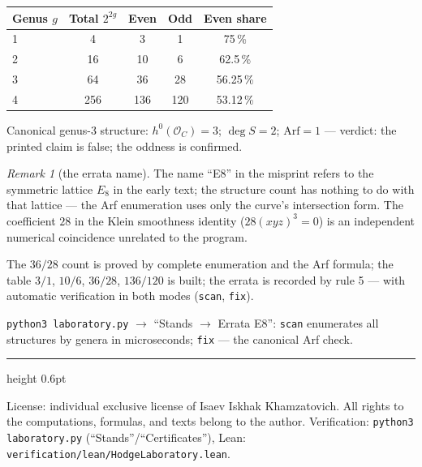 \documentclass[11pt,a4paper]{article}
\theoremstyle{plain}
\theoremstyle{definition}
\theoremstyle{remark}
\newtheorem{remark}[theorem]{Remark}
\begin{document}
\begin{databox}
\begin{center}
\begin{tabular}{@{}l c c c c@{}}
\toprule
Genus $g$ & Total $2^{2g}$ & Even & Odd & Even share \\
\midrule
1 & 4   & 3   & 1   & 75\,\% \\
2 & 16  & 10  & 6   & 62.5\,\% \\
3 & 64  & 36  & 28  & 56.25\,\% \\
4 & 256 & 136 & 120 & 53.12\,\% \\
\bottomrule
\end{tabular}
\end{center}
Canonical genus-3 structure: $h^0(\mathcal O_C)=3$; $\deg S=2$;
$\mathrm{Arf}=1$ --- verdict: the printed claim is false; the
oddness is confirmed.
\end{databox}

\begin{remark}[the errata name]
The name ``E8'' in the misprint refers to the symmetric lattice
$E_8$ in the early text; the structure count has nothing to do with
that lattice --- the Arf enumeration uses only the curve's
intersection form. The coefficient $28$ in the Klein smoothness
identity ($28(xyz)^3=0$) is an independent numerical coincidence
unrelated to the program.
\end{remark}

\begin{statusbox}[summary]
The $36/28$ count is proved by complete enumeration and the Arf formula; the table $3/1$, $10/6$, $36/28$, $136/120$ is built; the errata is recorded
by rule 5 --- with automatic verification in both modes
(\texttt{scan}, \texttt{fix}).
\end{statusbox}

\begin{verifybox}[reproduction]
\texttt{python3 laboratory.py} $\to$ ``Stands $\to$ Errata E8'':
\texttt{scan} enumerates all structures by genera in microseconds;
\texttt{fix} --- the canonical Arf check.
\end{verifybox}

\vfill
{\color{linkblue}\hrule height 0.6pt}
\vspace{0.5em}
{\small\color{gray}
License: individual exclusive license of Isaev Iskhak Khamzatovich.
All rights to the computations, formulas, and texts belong to the author.
Verification: \texttt{python3 laboratory.py} (``Stands''/``Certificates''),
Lean: \texttt{verification/lean/HodgeLaboratory.lean}.
}
\end{document}
